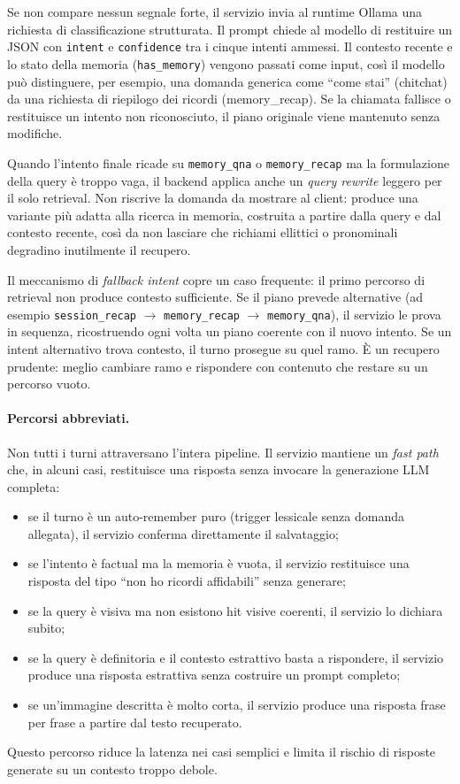 Se non compare nessun segnale forte, il servizio invia al runtime Ollama una richiesta di classificazione strutturata. Il prompt chiede al modello di restituire un JSON con \texttt{intent} e \texttt{confidence} tra i cinque intenti ammessi. Il contesto recente e lo stato della memoria (\texttt{has\_memory}) vengono passati come input, così il modello può distinguere, per esempio, una domanda generica come ``come stai'' (chitchat) da una richiesta di riepilogo dei ricordi (memory\_recap). Se la chiamata fallisce o restituisce un intento non riconosciuto, il piano originale viene mantenuto senza modifiche.

Quando l'intento finale ricade su \texttt{memory\_qna} o \texttt{memory\_recap} ma la formulazione della query è troppo vaga, il backend applica anche un \emph{query rewrite} leggero per il solo retrieval. Non riscrive la domanda da mostrare al client: produce una variante più adatta alla ricerca in memoria, costruita a partire dalla query e dal contesto recente, così da non lasciare che richiami ellittici o pronominali degradino inutilmente il recupero.

Il meccanismo di \emph{fallback intent} copre un caso frequente: il primo percorso di retrieval non produce contesto sufficiente. Se il piano prevede alternative (ad esempio \texttt{session\_recap} $\rightarrow$ \texttt{memory\_recap} $\rightarrow$ \texttt{memory\_qna}), il servizio le prova in sequenza, ricostruendo ogni volta un piano coerente con il nuovo intento. Se un intent alternativo trova contesto, il turno prosegue su quel ramo. È un recupero prudente: meglio cambiare ramo e rispondere con contenuto che restare su un percorso vuoto.

\paragraph{Percorsi abbreviati.}

Non tutti i turni attraversano l'intera pipeline. Il servizio mantiene un \emph{fast path} che, in alcuni casi, restituisce una risposta senza invocare la generazione LLM completa:
\begin{itemize}
\item se il turno è un auto-remember puro (trigger lessicale senza domanda allegata), il servizio conferma direttamente il salvataggio;
\item se l'intento è factual ma la memoria è vuota, il servizio restituisce una risposta del tipo ``non ho ricordi affidabili'' senza generare;
\item se la query è visiva ma non esistono hit visive coerenti, il servizio lo dichiara subito;
\item se la query è definitoria e il contesto estrattivo basta a rispondere, il servizio produce una risposta estrattiva senza costruire un prompt completo;
\item se un'immagine descritta è molto corta, il servizio produce una risposta frase per frase a partire dal testo recuperato.
\end{itemize}
Questo percorso riduce la latenza nei casi semplici e limita il rischio di risposte generate su un contesto troppo debole.

